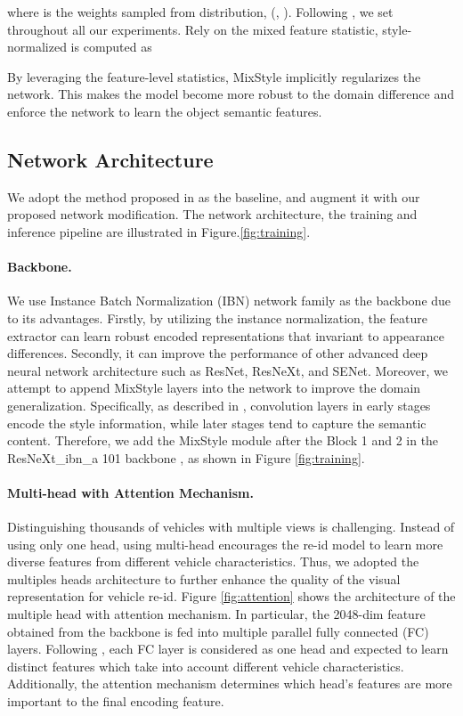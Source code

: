 \documentclass[10pt,twocolumn,letterpaper]{article}
\begin{document}
where  is the weights sampled from  distribution,   (, ). Following \cite{mixstyle}, we set  throughout all our experiments. Rely on the mixed feature statistic, style-normalized  is computed as 


By leveraging the feature-level statistics, MixStyle implicitly regularizes the network. This makes the model become more robust to the domain difference and enforce the network to learn the object semantic features.

\subsection{Network Architecture} \label{sub:network_architecture}
We adopt the method proposed in \cite{2nd} as the baseline, and augment it with our proposed network modification. The network architecture, the training and inference pipeline are illustrated in Figure.\ref{fig:training}.

\paragraph{Backbone.} We use Instance Batch Normalization (IBN) network family \cite{ibn} as the backbone due to its advantages. Firstly, by utilizing the instance normalization, the feature extractor can learn robust encoded representations that invariant to appearance differences. Secondly, it can improve the performance of other advanced deep neural network architecture such as ResNet, ResNeXt, and SENet. Moreover, we attempt to append MixStyle layers into the network to improve the domain generalization. Specifically, as described in \cite{mixstyle}, convolution layers in early stages encode the style information, while later stages tend to capture the semantic content. Therefore, we add the MixStyle module after the Block 1 and 2 in the ResNeXt\_ibn\_a 101 backbone \cite{ibn}, as shown in Figure \ref{fig:training}. 

\paragraph{Multi-head with Attention Mechanism.} Distinguishing thousands of vehicles with multiple views is challenging. Instead of using only one head, using multi-head encourages the re-id model to learn more diverse features from different vehicle characteristics. Thus, we adopted the multiples heads architecture \cite{groupface} to further enhance the quality of the visual representation for vehicle re-id. Figure \ref{fig:attention} shows the architecture of the multiple head with attention mechanism. In particular, the 2048-dim feature obtained from the backbone is fed into multiple parallel fully connected (FC) layers. Following \cite{groupface}, each FC layer is considered as one head and expected to learn distinct features which take into account different vehicle characteristics. Additionally, the attention mechanism determines which head's features are more important to the final encoding feature. 
\end{document}
